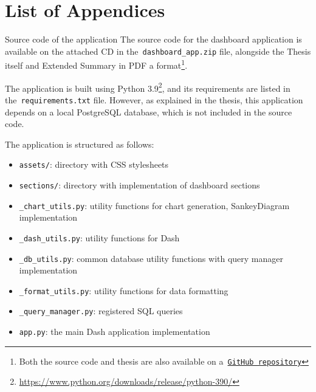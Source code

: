 \appendix
{}
\chapter*{List of Appendices}
\renewcommand{\thesection}{Appendix \Alph{section}}

\begin{section}{Source code of the application}
	\label{appendix:source-code}
	The source code for the dashboard application is available on the attached CD in the~\texttt{dashboard\_app.zip} file,
	alongside the Thesis itself and Extended Summary in PDF a format\footnote{Both the source code and thesis are also available on a~\href{https://github.com/filipditrich/master-thesis}{\texttt{GitHub repository}}}.

	The application is built using Python 3.9\footnote{\url{https://www.python.org/downloads/release/python-390/}}, and its requirements are listed in the~\texttt{requirements.txt} file.
	However, as explained in the thesis, this application depends on a local PostgreSQL database, which is not included in the source code.

	The application is structured as follows:
	\begin{itemize}
		\item \texttt{assets/}: directory with CSS stylesheets
		\item \texttt{sections/}: directory with implementation of dashboard sections
		\item \texttt{\_chart\_utils.py}: utility functions for chart generation, SankeyDiagram implementation
		\item \texttt{\_dash\_utils.py}: utility functions for Dash
		\item \texttt{\_db\_utils.py}: common database utility functions with query manager implementation
		\item \texttt{\_format\_utils.py}: utility functions for data formatting
		\item \texttt{\_query\_manager.py}: registered SQL queries
		\item \texttt{app.py}: the main Dash application implementation
	\end{itemize}

\end{section}